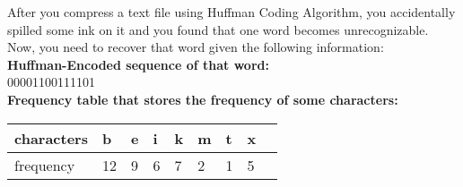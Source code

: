 
After you compress a text file using Huffman Coding Algorithm, you accidentally spilled some ink on it and you found that one word becomes unrecognizable. Now, you need to recover that word given the following information:\\

\textbf{Huffman-Encoded sequence of that word: } \\
00001100111101\\
\textbf{Frequency table that stores the frequency of some characters: }\\
\begin{table}[!hbtp]
    \centering
    \begin{tabular}{|l|l|l|l|l|l|l|l|l|}
        \hline
        characters & b  & e & i & k & m & t & x \\ \hline
        frequency  & 12 & 9 & 6 & 7 & 2 & 1 & 5 \\ \hline
    \end{tabular}
\end{table}\\\\
